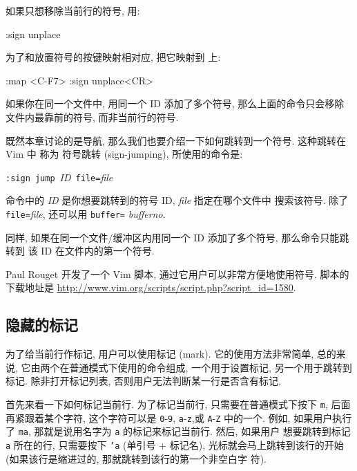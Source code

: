 \begin{vimcode}
如果只想移除当前行的符号, 用:
\begin{vimcode}
:sign unplace
\end{vimcode}
为了和放置符号的按键映射相对应, 把它映射到  上:
\begin{vimcode}
:map <C-F7> :sign unplace<CR>
\end{vimcode}

\begin{warning}
    如果你在同一个文件中, 用同一个 ID 添加了多个符号, 那么上面的命令只会移除
    文件内最靠前的符号, 而非当前行的符号.
\end{warning}

既然本章讨论的是导航, 那么我们也要介绍一下如何跳转到一个符号. 这种跳转在 Vim 中
称为 符号跳转 (sign-jumping), 所使用的命令是:
\begin{vimcmdform}
\texttt{:sign jump}\ \textit{ID}\ \texttt{file=}\textit{file}
\end{vimcmdform}
命令中的 \textit{ID} 是你想要跳转到的符号 ID, \textit{file} 指定在哪个文件中
搜索该符号. 除了 \texttt{file=}\textit{file}, 还可以用 \texttt{buffer=}%
\textit{bufferno}.

同样, 如果在同一个文件/缓冲区内用同一个 ID 添加了多个符号, 那么命令只能跳转到
该 ID 在文件内的第一个符号.

\begin{warning}
    Paul Rouget 开发了一个 Vim 脚本, 通过它用户可以非常方便地使用符号. 脚本的
    下载地址是 \url{http://www.vim.org/scripts/script.php?script_id=1580}.
\end{warning}

\subsection{隐藏的标记}
\label{subsec:hidden_markers_using_marks}

为了给当前行作标记, 用户可以使用标记 (mark). 它的使用方法非常简单, 总的来说,
它由两个在普通模式下使用的命令组成, 一个用于设置标记, 另一个用于跳转到标记.
除非打开标记列表, 否则用户无法判断某一行是否含有标记.

首先来看一下如何标记当前行. 为了标记当前行, 只需要在普通模式下按下
\texttt{m}, 后面再紧跟着某个字符, 这个字符可以是 \texttt{0}-\texttt{9},
\texttt{a}-\texttt{z},或 \texttt{A}-\texttt{Z} 中的一个. 例如, 如果用户执行
了 \texttt{ma}, 那就是说用名字为 \texttt{a} 的标记来标记当前行. 然后, 如果用户
想要跳转到标记 \texttt{a} 所在的行, 只需要按下 \texttt{'a} (单引号 + 标记名),
光标就会马上跳转到该行的开始 (如果该行是缩进过的, 那就跳转到该行的第一个非空白字
符).


\end{vimcode}
